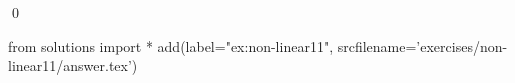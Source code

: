 
\begin{ex} 
  \label{ex:non-linear11}
  
  \qed
\end{ex} 
\begin{python0}
from solutions import *
add(label="ex:non-linear11",
    srcfilename='exercises/non-linear11/answer.tex') 
\end{python0}
